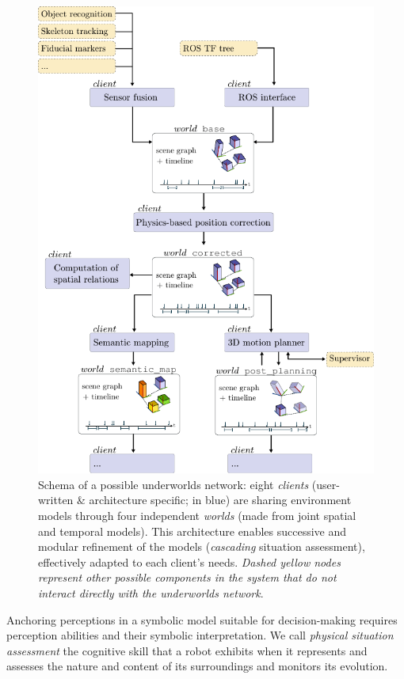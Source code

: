 \documentclass[conference]{IEEEtran}
\newcommand{\uwds}{{\sc underworlds}\xspace}
\begin{document}
\begin{figure}[ht!]
    \centering
    \includegraphics[width=\linewidth]{overview}
    \caption{Schema of a possible \uwds network: eight \emph{clients} (user-written \&
    architecture specific; in blue) are sharing environment
    models through four independent \emph{worlds} (made from joint spatial and
    temporal models). This architecture enables successive and modular
    refinement of the models (\emph{cascading} situation assessment),
    effectively adapted to each client's needs. \textit{Dashed yellow nodes represent
    other possible components in the system that do not interact directly with
    the \uwds network}.}

    \label{fig|scene}

\end{figure}


Anchoring perceptions in a symbolic model suitable for decision-making requires
perception abilities and their symbolic interpretation. We call \emph{physical
situation assessment} the cognitive skill that a robot exhibits when it
represents and assesses the nature and content of its surroundings and monitors
its evolution.
\end{document}

